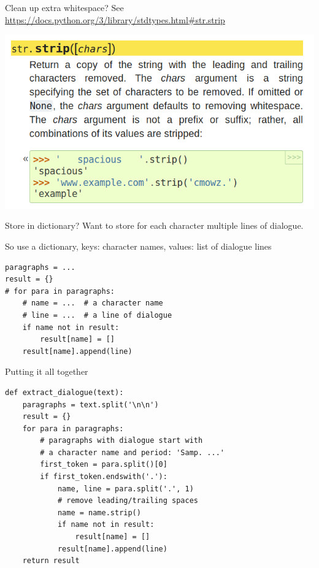 \documentclass[aspectratio=169,usenames,dvipsnames]{beamer}
\begin{document}
\begin{frame}[fragile]{Clean up extra whitespace?}
    See \url{https://docs.python.org/3/library/stdtypes.html\#str.strip}

    \vspace{1em}
    \centering
    \includegraphics[width=0.9\linewidth]{fig/stripdocs}
\end{frame}

\begin{frame}[fragile]{Store in dictionary?}
    Want to store for each character multiple lines of dialogue.

    \vspace{1em}
    So use a dictionary, keys: character names, values: list of dialogue lines
\begin{lstlisting}
paragraphs = ...
result = {}
# for para in paragraphs:
    # name = ...  # a character name
    # line = ...  # a line of dialogue
    if name not in result:
        result[name] = []
    result[name].append(line)
\end{lstlisting}
\end{frame}

\begin{frame}[fragile]{Putting it all together}
\begin{lstlisting}
def extract_dialogue(text):
    paragraphs = text.split('\n\n')
    result = {}
    for para in paragraphs:
        # paragraphs with dialogue start with
        # a character name and period: 'Samp. ...'
        first_token = para.split()[0]
        if first_token.endswith('.'):
            name, line = para.split('.', 1)
            # remove leading/trailing spaces
            name = name.strip()
            if name not in result:
                result[name] = []
            result[name].append(line)
    return result
\end{lstlisting}
\end{frame}
\end{document}
